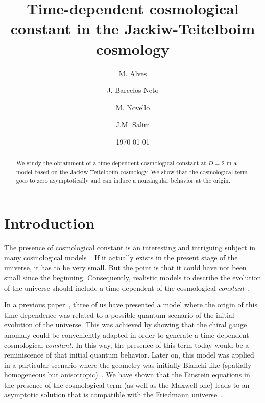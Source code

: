 \documentclass[a4paper,twocolumn,prd,groupedaddress,nofootinbib,showpacs]
{revtex4}
\begin{document}
\title{Time-dependent cosmological constant in the
Jackiw-Teitelboim cosmology}

\author{M. Alves}
\author{J. Barcelos-Neto}
\author{M. Novello}
\author{J.M. Salim}

\date{\today}

\begin{abstract}
We study the obtainment of a time-dependent cosmological constant at
$D=2$ in a model based on the Jackiw-Teitelboim cosmology. We show
that the cosmological term goes to zero asymptotically and can induce
a nonsingular behavior at the origin.
\end{abstract}


\maketitle

\section{Introduction}

The presence of cosmological constant is an interesting and intriguing
subject in many cosmological models~\cite{Weinberg}. If it actually
exists in the present stage of the universe, it has to be very small.
But the point is that it could have not been small since the
beginning. Consequently, realistic models to describe the evolution of
the universe should include a time-dependent of the cosmological {\it
constant}~\cite{Ozer}.

\medskip
In a previous paper~\cite{Novello1}, three of us have presented a
model where the origin of this time dependence was  related to a
possible quantum scenario of the initial evolution of the universe.
This was achieved by showing that the chiral gauge anomaly could be
conveniently adapted in order to generate a time-dependent
cosmological {\it constant}. In this way, the presence of this term
today would be a reminiscence of that initial quantum behavior. Later
on, this model was applied~\cite{Novello2} in a particular scenario
where the geometry was initially Bianchi-like (spatially homogeneous
but anisotropic)~\cite{Belinsky}. We have shown that the Einstein
equations in the presence of the cosmological term (as well as the
Maxwell one) leads to an asymptotic solution that is compatible with
the Friedmann universe~\cite{Weinberg,Novello3}.
\end{document}
